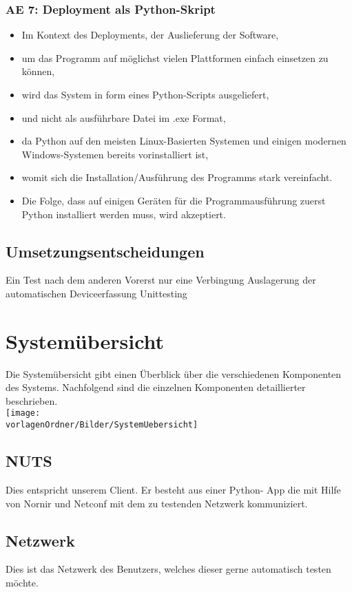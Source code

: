 \documentclass[
	ngerman,
	toc=listof, %
	toc=bibliography, %
	footnotes=multiple, %
	parskip=half, %
	numbers=noendperiod %
]{scrartcl}
\newcommand{\vorlagenOrdner}{../../99_Vorlagen} %
\begin{document}
		\subsubsection{AE 7: Deployment als Python-Skript}
		\begin{itemize}
			\item Im Kontext des Deployments, der Auslieferung der Software,
			\item um das Programm auf möglichst vielen Plattformen einfach einsetzen zu können,
			\item wird das System in form eines Python-Scripts ausgeliefert,
			\item und nicht als ausführbare Datei im .exe Format,
			\item da Python auf den meisten Linux-Basierten Systemen und einigen modernen Windows-Systemen bereits vorinstalliert ist,
			\item womit sich die Installation/Ausführung des Programms stark vereinfacht.
			\item Die Folge, dass auf einigen Geräten für die Programmausführung zuerst Python installiert werden muss, wird akzeptiert.
		\end{itemize}

	\subsection{Umsetzungsentscheidungen}
	Ein Test nach dem anderen
	Vorerst nur eine Verbingung
	Auslagerung der automatischen Deviceerfassung
	Unittesting


\section{Systemübersicht}
	Die Systemübersicht gibt einen Überblick über die verschiedenen Komponenten des Systems. Nachfolgend sind die einzelnen Komponenten detaillierter beschrieben.\\
	\texttt{[image: \\vorlagenOrdner/Bilder/SystemUebersicht]}

	\subsection{NUTS}
		Dies entspricht unserem Client. Er besteht aus einer Python- App die mit Hilfe von Nornir und Netconf mit dem zu testenden Netzwerk kommuniziert.

	\subsection{Netzwerk}
		Dies ist das Netzwerk des Benutzers, welches dieser gerne automatisch testen möchte.
\end{document}
